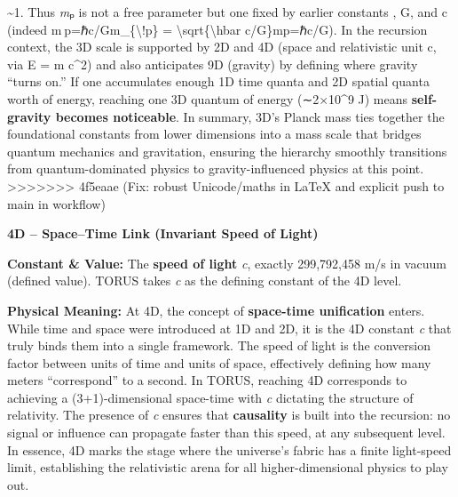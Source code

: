\documentclass[]{article}
\begin{document}
\textasciitilde{}1​. Thus \emph{m}ₚ is not a free parameter but one
fixed by earlier constants \hbar, G, and c (indeed
m ⁣p=ℏc/Gm\_\{\textbackslash{}!p\} =
\textbackslash{}sqrt\{\textbackslash{}hbar c/G\}mp​=ℏc/G​). In the
recursion context, the 3D scale is supported by 2D and 4D (space and
relativistic unit c, via E = m c\^{}2) and also anticipates 9D (gravity)
by defining where gravity ``turns on.'' If one accumulates enough 1D
time quanta and 2D spatial quanta worth of energy, reaching one 3D
quantum of energy (∼2×10\^{}9 J) means \textbf{self-gravity becomes
noticeable}​. In summary, 3D's Planck mass ties together the
foundational constants from lower dimensions into a mass scale that
bridges quantum mechanics and gravitation, ensuring the hierarchy
smoothly transitions from quantum-dominated physics to
gravity-influenced physics at this point.
>>>>>>> 4f5eaae (Fix: robust Unicode/maths in LaTeX and explicit push to main in workflow)

\textbf{4D -- Space--Time Link (Invariant Speed of Light)}

\textbf{Constant \& Value:} The \textbf{speed of light} \emph{c},
exactly 299,792,458 m/s in vacuum (defined value)​. TORUS takes \emph{c}
as the defining constant of the 4D level.

\textbf{Physical Meaning:} At 4D, the concept of \textbf{space-time
unification} enters. While time and space were introduced at 1D and 2D,
it is the 4D constant \emph{c} that truly binds them into a single
framework. The speed of light is the conversion factor between units of
time and units of space​, effectively defining how many meters
``correspond'' to a second. In TORUS, reaching 4D corresponds to
achieving a (3+1)-dimensional space-time with \emph{c} dictating the
structure of relativity. The presence of \emph{c} ensures that
\textbf{causality} is built into the recursion: no signal or influence
can propagate faster than this speed, at any subsequent level​. In
essence, 4D marks the stage where the universe's fabric has a finite
light-speed limit, establishing the relativistic arena for all
higher-dimensional physics to play out.
\end{document}
